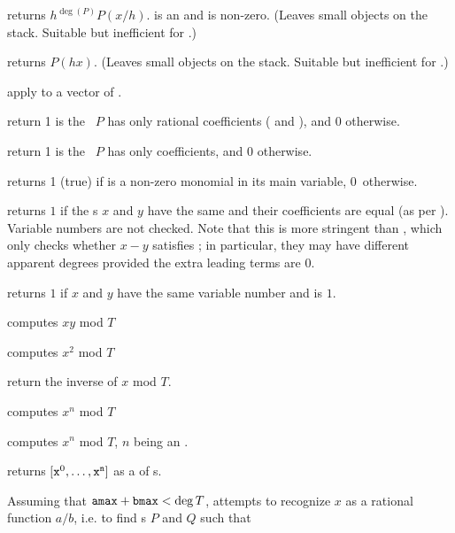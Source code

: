  returns $h^{\deg(P)} P(x/h)$.
 is an  and  is non-zero. (Leaves small objects on the
stack. Suitable but inefficient for .)

 returns $P(h x)$. (Leaves small objects
on the stack. Suitable but inefficient for .)

 apply  to a vector
of .

 return 1 is the ~$P$ has only
rational coefficients ( and ), and 0 otherwise.

 return 1 is the ~$P$ has only
 coefficients, and 0 otherwise.

 returns 1 (true) if  is a non-zero
monomial in its main variable, 0~otherwise.

 returns $1$ if the s $x$ and $y$
have the same  and their coefficients are equal (as per
). Variable numbers are not checked. Note that this is more
stringent than , which only checks whether $x - y$ satisfies
; in particular, they may have different apparent degrees provided
the extra leading terms are $0$.

 returns $1$ if $x$ and $y$
have the same variable number and  is $1$.
\smallskip

 computes $xy$ mod $T$

 computes $x^2$ mod $T$

 return the inverse of $x$ mod $T$.

 computes $x^n$ mod $T$

 computes $x^n$ mod $T$,
$n$ being an .

 returns $[{\tt x}^0,
\dots, {\tt x}^{\tt n}]$ as a  of s.

Assuming that ${\tt amax}+{\tt bmax}<\deg T$,
attempts to recognize $x$ as a rational function $a/b$, i.e. to find s $P$ and $Q$ such that

